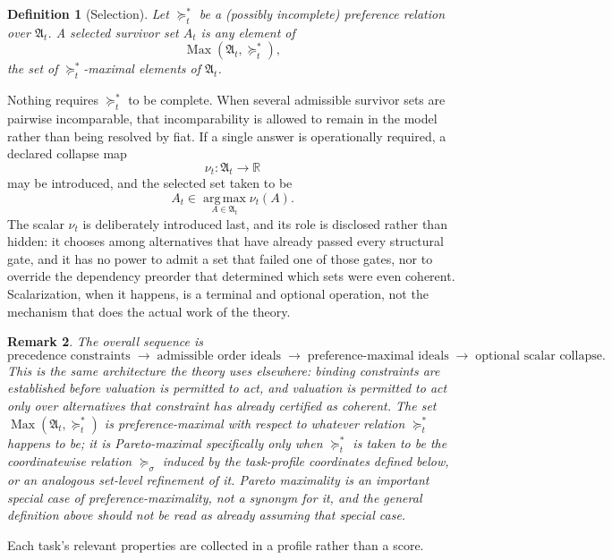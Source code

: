 \documentclass[11pt]{report}
\newtheorem{definition}{Definition}[chapter]
\newtheorem{remark}[definition]{Remark}
\begin{document}
\begin{definition}[Selection]
Let $\succeq_t^\ast$ be a (possibly incomplete) preference relation over $\mathfrak A_t$. A selected survivor set $A_t$ is any element of
\[
\operatorname{Max}(\mathfrak A_t, \succeq_t^\ast),
\]
the set of $\succeq_t^\ast$-maximal elements of $\mathfrak A_t$.
\end{definition}

Nothing requires $\succeq_t^\ast$ to be complete. When several admissible survivor sets are pairwise incomparable, that incomparability is allowed to remain in the model rather than being resolved by fiat. If a single answer is operationally required, a declared collapse map
\[
\nu_t : \mathfrak A_t \to \mathbb{R}
\]
may be introduced, and the selected set taken to be
\[
A_t \in \operatorname*{arg\,max}_{A \in \mathfrak A_t} \nu_t(A).
\]
The scalar $\nu_t$ is deliberately introduced last, and its role is disclosed rather than hidden: it chooses among alternatives that have already passed every structural gate, and it has no power to admit a set that failed one of those gates, nor to override the dependency preorder that determined which sets were even coherent. Scalarization, when it happens, is a terminal and optional operation, not the mechanism that does the actual work of the theory.

\begin{remark}
The overall sequence is
\[
\text{precedence constraints} \;\longrightarrow\; \text{admissible order ideals} \;\longrightarrow\; \text{preference-maximal ideals} \;\longrightarrow\; \text{optional scalar collapse.}
\]
This is the same architecture the theory uses elsewhere: binding constraints are established before valuation is permitted to act, and valuation is permitted to act only over alternatives that constraint has already certified as coherent. The set $\operatorname{Max}(\mathfrak A_t, \succeq_t^\ast)$ is preference-maximal with respect to whatever relation $\succeq_t^\ast$ happens to be; it is Pareto-maximal specifically only when $\succeq_t^\ast$ is taken to be the coordinatewise relation $\succeq_\sigma$ induced by the task-profile coordinates defined below, or an analogous set-level refinement of it. Pareto maximality is an important special case of preference-maximality, not a synonym for it, and the general definition above should not be read as already assuming that special case.
\end{remark}

Each task's relevant properties are collected in a profile rather than a score.
\end{document}

